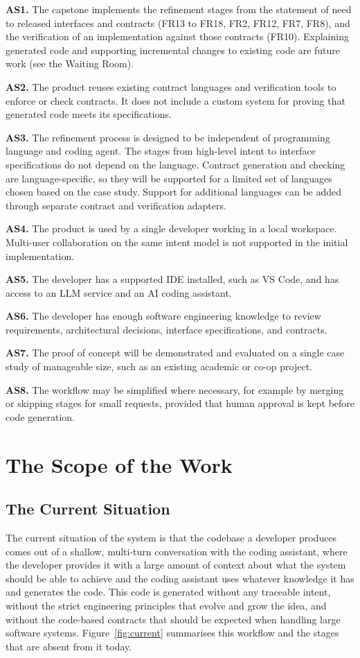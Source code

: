 \documentclass[12pt]{article}
\begin{document}
\medskip
\noindent\textbf{AS1.} The capstone implements the refinement stages from the
statement of need to released interfaces and contracts (FR13 to FR18, FR2,
FR12, FR7, FR8), and the verification of an implementation against those
contracts (FR10). Explaining generated code and supporting incremental changes
to existing code are future work (see the Waiting Room).

\medskip
\noindent\textbf{AS2.} The product reuses existing contract languages and
verification tools to enforce or check contracts. It does not include a custom
system for proving that generated code meets its specifications.

\medskip
\noindent\textbf{AS3.} The refinement process is designed to be independent of
programming language and coding agent. The stages from high-level intent to
interface specifications do not depend on the language. Contract generation and
checking are language-specific, so they will be supported for a limited set of
languages chosen based on the case study. Support for additional languages can
be added through separate contract and verification adapters.

\medskip
\noindent\textbf{AS4.} The product is used by a single developer working in a
local workspace. Multi-user collaboration on the same intent model is not
supported in the initial implementation.

\medskip
\noindent\textbf{AS5.} The developer has a supported IDE installed, such as VS
Code, and has access to an LLM service and an AI coding assistant.

\medskip
\noindent\textbf{AS6.} The developer has enough software engineering knowledge
to review requirements, architectural decisions, interface specifications, and
contracts.

\medskip
\noindent\textbf{AS7.} The proof of concept will be demonstrated and evaluated
on a single case study of manageable size, such as an existing academic or
co-op project.

\medskip
\noindent\textbf{AS8.} The workflow may be simplified where necessary, for
example by merging or skipping stages for small requests, provided that human
approval is kept before code generation.

\section{The Scope of the Work}
\subsection{The Current Situation}
The current situation of the system is that the codebase a developer produces
comes out of a shallow, multi-turn conversation with the coding assistant, where
the developer provides it with a large amount of context about what the system
should be able to achieve and the coding assistant uses whatever knowledge it
has and generates the code. This code is generated without any traceable intent,
without the strict engineering principles that evolve and grow the idea, and
without the code-based contracts that should be expected when handling large
software systems. Figure~\ref{fig:current} summarises this workflow and the
stages that are absent from it today.
\end{document}
